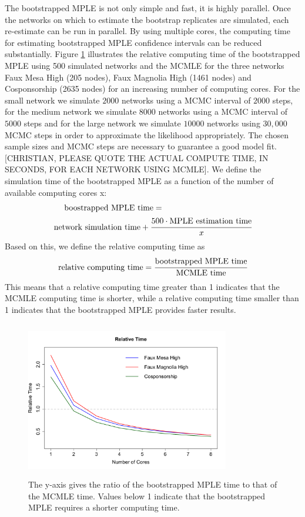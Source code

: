 \documentclass[10pt, conference, compsocconf]{IEEEtran}
\begin{document}
\noindent The bootstrapped MPLE is not only simple and fast, it is highly parallel. Once the networks on which to estimate the bootstrap replicates are simulated, each re-estimate can be run in parallel. By using multiple cores, the computing time for estimating bootstrapped MPLE confidence intervals can be reduced substantially. Figure \ref{comptime} illustrates the relative computing time of the bootstrapped MPLE using 500 simulated networks and the MCMLE for the three networks Faux Mesa High (205 nodes), Faux Magnolia High (1461 nodes) and Cosponsorship (2635 nodes) for an increasing number of computing cores. For the small network we simulate $2000$ networks using a MCMC interval of $2000$ steps, for the medium network we simulate $8000$ networks using a MCMC interval of $5000$ steps and for the large network we simulate $10000$ networks using $30,000$ MCMC steps in order to approximate the likelihood appropriately. The chosen sample sizes and MCMC steps are necessary to guarantee a good model fit. [CHRISTIAN, PLEASE QUOTE THE ACTUAL COMPUTE TIME, IN SECONDS, FOR EACH NETWORK USING MCMLE]. We define the simulation time of the bootstrapped MPLE as a function of the number of available computing cores x:
\begin{equation*}
\begin{split}
\text{boostrapped MPLE time} = ~~~~~~~~~~~~~~~~~~~~~~~~~~~~~~~~~ \\ \text{network simulation time} + \cfrac{500 \cdot \text{MPLE estimation time}}{x}
\end{split}
\end{equation*}     
Based on this, we define the relative computing time as
$$\text{relative computing time}= \cfrac{\text{bootstrapped MPLE time}}{\text{MCMLE time}}$$
This means that a relative computing time greater than 1 indicates that the MCMLE computing time is shorter, while a relative computing time smaller than 1 indicates that the bootstrapped MPLE provides faster results. \\[0.3cm]
\begin{figure}[!t]
\centering
\includegraphics[width=3.5in, height=2.7in]{rel_time}
\caption{The y-axis gives the ratio of the bootstrapped MPLE time to that of the MCMLE time. Values below 1 indicate that the bootstrapped MPLE requires a shorter computing time.}
\label{comptime}
\end{figure}
\end{document}
